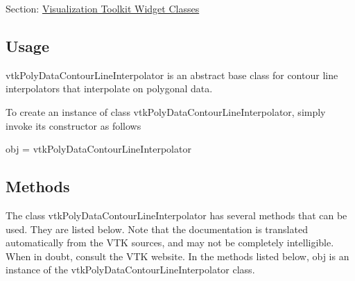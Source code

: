 Section\-: \hyperlink{sec_vtkwidgets}{Visualization Toolkit Widget Classes} \hypertarget{vtkwidgets_vtkxyplotwidget_Usage}{}\subsection{Usage}\label{vtkwidgets_vtkxyplotwidget_Usage}
vtk\-Poly\-Data\-Contour\-Line\-Interpolator is an abstract base class for contour line interpolators that interpolate on polygonal data.

To create an instance of class vtk\-Poly\-Data\-Contour\-Line\-Interpolator, simply invoke its constructor as follows \begin{DoxyVerb}  obj = vtkPolyDataContourLineInterpolator
\end{DoxyVerb}
 \hypertarget{vtkwidgets_vtkxyplotwidget_Methods}{}\subsection{Methods}\label{vtkwidgets_vtkxyplotwidget_Methods}
The class vtk\-Poly\-Data\-Contour\-Line\-Interpolator has several methods that can be used. They are listed below. Note that the documentation is translated automatically from the V\-T\-K sources, and may not be completely intelligible. When in doubt, consult the V\-T\-K website. In the methods listed below, {\ttfamily obj} is an instance of the vtk\-Poly\-Data\-Contour\-Line\-Interpolator class. 
